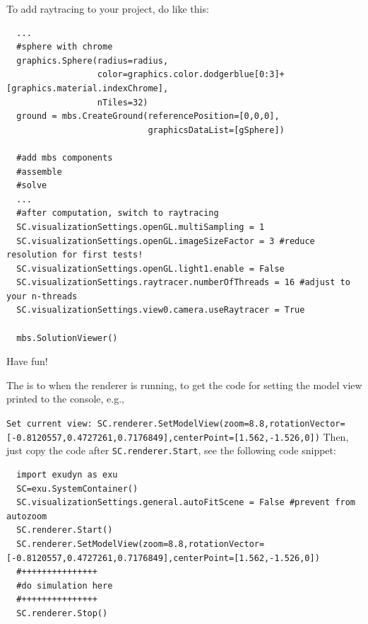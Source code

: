 \noindent To add raytracing to your project, do like this:
\pythonstyle\begin{lstlisting}
  ...
  #sphere with chrome
  graphics.Sphere(radius=radius, 
                  color=graphics.color.dodgerblue[0:3]+[graphics.material.indexChrome], 
                  nTiles=32)
  ground = mbs.CreateGround(referencePosition=[0,0,0],
                            graphicsDataList=[gSphere])

  #add mbs components
  #assemble
  #solve
  ...
  #after computation, switch to raytracing
  SC.visualizationSettings.openGL.multiSampling = 1
  SC.visualizationSettings.openGL.imageSizeFactor = 3 #reduce resolution for first tests!
  SC.visualizationSettings.openGL.light1.enable = False
  SC.visualizationSettings.raytracer.numberOfThreads = 16 #adjust to your n-threads
  SC.visualizationSettings.view0.camera.useRaytracer = True
  
  mbs.SolutionViewer()
\end{lstlisting}

\noindent Have fun!


The  is to  when the renderer is running, to get the code for setting the model view printed to the console, e.g., 
\bi
\item[] \texttt{Set current view: SC.renderer.SetModelView(zoom=8.8,rotationVector=}\\
        \texttt{[-0.8120557,0.4727261,0.7176849],centerPoint=[1.562,-1.526,0])}
\ei
Then, just copy the code after \texttt{SC.renderer.Start}, see the following code snippet:
\pythonstyle\begin{lstlisting}
  import exudyn as exu
  SC=exu.SystemContainer()
  SC.visualizationSettings.general.autoFitScene = False #prevent from autozoom
  SC.renderer.Start()
  SC.renderer.SetModelView(zoom=8.8,rotationVector=[-0.8120557,0.4727261,0.7176849],centerPoint=[1.562,-1.526,0])
  #+++++++++++++++
  #do simulation here
  #+++++++++++++++
  SC.renderer.Stop()
\end{lstlisting}
\horizontalRuler

